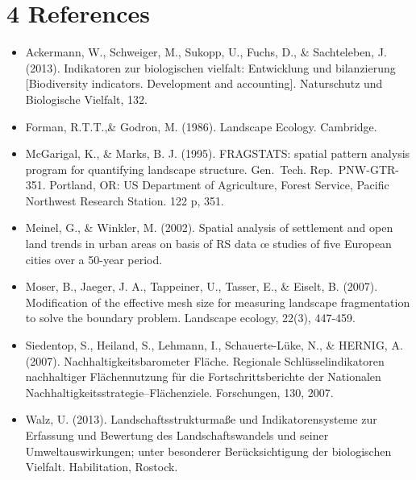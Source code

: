 \documentclass[]{article}
\begin{document}
\section{4 References}\label{references}

\begin{itemize}
\item
  Ackermann, W., Schweiger, M., Sukopp, U., Fuchs, D., \& Sachteleben,
  J. (2013). Indikatoren zur biologischen vielfalt: Entwicklung und
  bilanzierung {[}Biodiversity indicators. Development and
  accounting{]}. Naturschutz und Biologische Vielfalt, 132.
\item
  Forman, R.T.T.,\& Godron, M. (1986). Landscape Ecology. Cambridge.
\item
  McGarigal, K., \& Marks, B. J. (1995). FRAGSTATS: spatial pattern
  analysis program for quantifying landscape structure. Gen.~Tech.
  Rep.~PNW-GTR-351. Portland, OR: US Department of Agriculture, Forest
  Service, Pacific Northwest Research Station. 122 p, 351.
\item
  Meinel, G., \& Winkler, M. (2002). Spatial analysis of settlement and
  open land trends in urban areas on basis of RS data œ studies of five
  European cities over a 50-year period.
\item
  Moser, B., Jaeger, J. A., Tappeiner, U., Tasser, E., \& Eiselt, B.
  (2007). Modification of the effective mesh size for measuring
  landscape fragmentation to solve the boundary problem. Landscape
  ecology, 22(3), 447-459.
\item
  Siedentop, S., Heiland, S., Lehmann, I., Schauerte-Lüke, N., \&
  HERNIG, A. (2007). Nachhaltigkeitsbarometer Fläche. Regionale
  Schlüsselindikatoren nachhaltiger Flächennutzung für die
  Fortschrittsberichte der Nationalen
  Nachhaltigkeitsstrategie--Flächenziele. Forschungen, 130, 2007.
\item
  Walz, U. (2013). Landschaftsstrukturmaße und Indikatorensysteme zur
  Erfassung und Bewertung des Landschaftswandels und seiner
  Umweltauswirkungen; unter besonderer Berücksichtigung der biologischen
  Vielfalt. Habilitation, Rostock.
\end{itemize}
\end{document}
